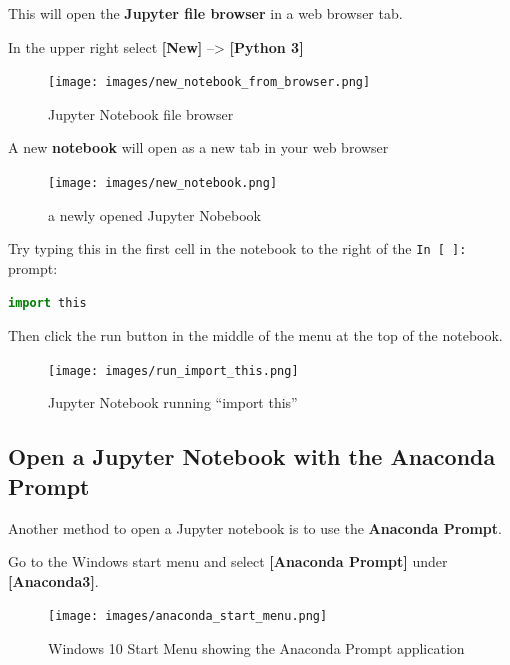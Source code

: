 \documentclass{book}
\begin{document}
This will open the \textbf{Jupyter file browser} in a web browser tab.

In the upper right select \textbf{{[}New{]}} --\textgreater{}
\textbf{{[}Python 3{]}}

\begin{figure}
\centering
\texttt{[image: images/new\_notebook\_from\_browser.png]}
\caption{Jupyter Notebook file browser}
\end{figure}

A new \textbf{notebook} will open as a new tab in your web browser

\begin{figure}
\centering
\texttt{[image: images/new\_notebook.png]}
\caption{a newly opened Jupyter Nobebook}
\end{figure}

Try typing this in the first cell in the notebook to the right of the
\lstinline!In [ ]:! prompt:

\begin{lstlisting}[language=Python]
import this
\end{lstlisting}

Then click the run button in the middle of the menu at the top of the
notebook.

\begin{figure}
\centering
\texttt{[image: images/run\_import\_this.png]}
\caption{Jupyter Notebook running ``import this''}
\end{figure}
    




    
        \subsection{Open a Jupyter Notebook with the Anaconda
Prompt}\label{open-a-jupyter-notebook-with-the-anaconda-prompt}
    




    
        Another method to open a Jupyter notebook is to use the \textbf{Anaconda
Prompt}.

Go to the Windows start menu and select \textbf{{[}Anaconda Prompt{]}}
under \textbf{{[}Anaconda3{]}}.

\begin{figure}
\centering
\texttt{[image: images/anaconda\_start\_menu.png]}
\caption{Windows 10 Start Menu showing the Anaconda Prompt application}
\end{figure}
\end{document}
